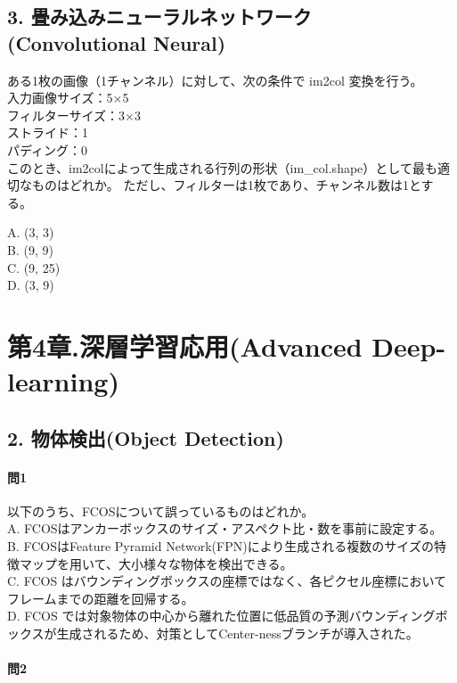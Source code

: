 \documentclass[
  letterpaper,
  DIV=11,
  numbers=noendperiod]{scrreprt}
\begin{document}
\chapter{3. 畳み込みニューラルネットワーク (Convolutional
Neural)}\label{ux7573ux307fux8fbcux307fux30cbux30e5ux30fcux30e9ux30ebux30cdux30c3ux30c8ux30efux30fcux30af-convolutional-neural}

ある1枚の画像（1チャンネル）に対して、次の条件で im2col 変換を行う。\\
入力画像サイズ：5×5\\
フィルターサイズ：3×3\\
ストライド：1\\
パディング：0\\
このとき、im2colによって生成される行列の形状（im\_col.shape）として最も適切なものはどれか。
ただし、フィルターは1枚であり、チャンネル数は1とする。

A. (3, 3)\\
B. (9, 9)\\
C. (9, 25)\\
D. (3, 9)

\part{第4章.深層学習応用(Advanced Deep-learning)}

\chapter{2. 物体検出(Object
Detection)}\label{ux7269ux4f53ux691cux51faobject-detection}

\subsection{問1}\label{ux554f1}

以下のうち、FCOSについて誤っているものはどれか。\\
A. FCOSはアンカーボックスのサイズ・アスペクト比・数を事前に設定する。\\
B. FCOSはFeature Pyramid
Network(FPN)により生成される複数のサイズの特徴マップを用いて、大小様々な物体を検出できる。\\
C. FCOS
はバウンディングボックスの座標ではなく、各ピクセル座標においてフレームまでの距離を回帰する。\\
D. FCOS
では対象物体の中心から離れた位置に低品質の予測バウンディングボックスが生成されるため、対策としてCenter-nessブランチが導入された。

\subsection{問2}\label{ux554f2}
\end{document}
